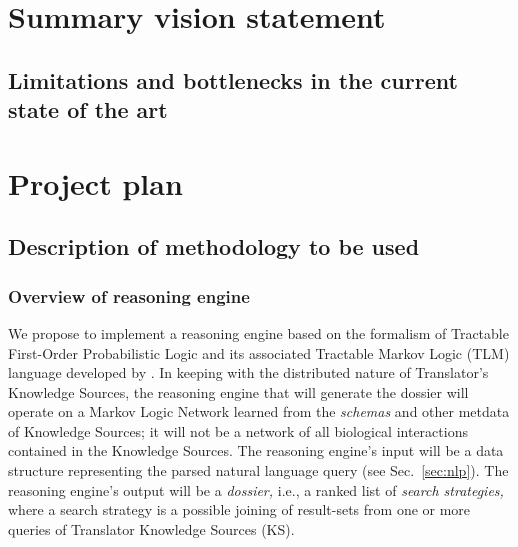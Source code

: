 \documentclass[11pt,notitlepage]{article}
\begin{document}
\section{Summary vision statement}

\subsection{Limitations and bottlenecks in the current state of the art}

\section{Project plan}
\subsection{Description of methodology to be used}
\subsubsection{Overview of reasoning engine}
We propose to implement a reasoning engine based on the formalism of Tractable
First-Order Probabilistic Logic and its associated Tractable Markov Logic (TLM)
language developed by \citet{Domingos:2012wi}. In keeping with the distributed
nature of Translator's Knowledge Sources, the reasoning engine that will
generate the dossier will operate on a Markov Logic Network learned from the
{\em schemas\/} and other metdata of Knowledge Sources; it will not be a network
of all biological interactions contained in the Knowledge Sources. The reasoning
engine's input will be a data structure representing the parsed natural language
query (see Sec.~\ref{sec:nlp}). The reasoning engine's output will be a {\em
  dossier,\/} i.e., a ranked list of {\em search strategies,\/} where a search
strategy is a possible joining of result-sets from one or more queries of
Translator Knowledge Sources (KS).
\end{document}
